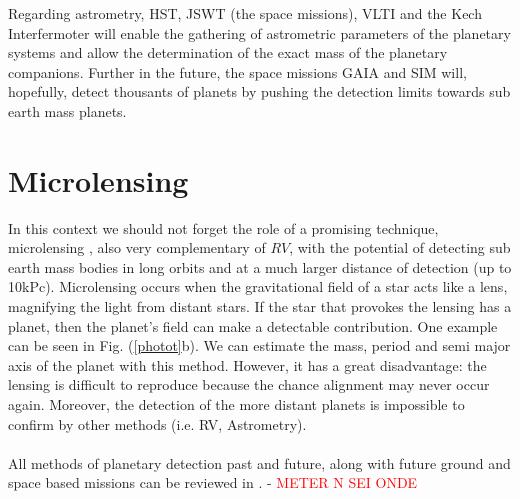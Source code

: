 \documentclass[dvips,12pt,a4paper]{report}
\begin{document}
Regarding astrometry, HST, JSWT (the space missions), VLTI and the Kech Interfermoter will enable the gathering of astrometric parameters of the planetary systems and allow the determination of the exact mass of the planetary companions. Further in the future, the space missions GAIA and SIM will, hopefully, detect thousants of planets by pushing the detection limits towards sub earth mass planets.



\section{Microlensing} 
\label{microlens}
\indent In this context we should not forget the role of a promising technique, microlensing \citep{Beaulieu-2006}, also very complementary of $RV$, with the potential of detecting sub earth mass bodies in long orbits and at a much larger distance of detection (up to 10kPc). Microlensing occurs when the gravitational field of a star acts like a lens, magnifying the light from distant stars. If the star that provokes the lensing has a planet, then the planet's field can make a detectable contribution. One example can be seen in Fig. (\ref{photot}b). We can estimate the mass, period and semi major axis of the planet with this method. However, it has a great disadvantage: the lensing is difficult to reproduce because the chance alignment may never occur again. Moreover, the detection of the more distant planets is impossible to confirm  by other methods (i.e. RV, Astrometry).
\\
\\
All methods of planetary detection past and future, along with future ground and space based missions can be reviewed in \citet{Perryman-2005}. - \textcolor{red}{METER N SEI ONDE}







\end{document}
